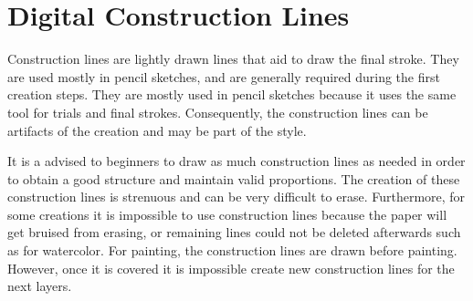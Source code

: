 \documentclass{sigchi}
\begin{document}









\section{Digital Construction Lines }

  Construction lines are lightly drawn lines that aid to draw the final
  stroke. They are used mostly in pencil sketches, and are generally
  required during the first creation steps. They are mostly
  used in pencil sketches because it uses the same tool for trials and
  final strokes. Consequently, the construction lines can be artifacts of the
  creation and may be part of the style. 

  It is a advised to beginners to draw as much construction lines as
  needed in order to obtain a good structure and maintain valid proportions.
  The creation of these construction lines is strenuous and 
  can be very difficult to erase. 
  Furthermore, for some creations it is impossible to use construction lines
  because the paper will get bruised from erasing, or remaining lines
  could not be deleted afterwards such as for watercolor. 
  For painting, the construction lines are drawn before
  painting. However, once it is covered it is impossible create new
  construction lines for the next layers. 
\end{document}
